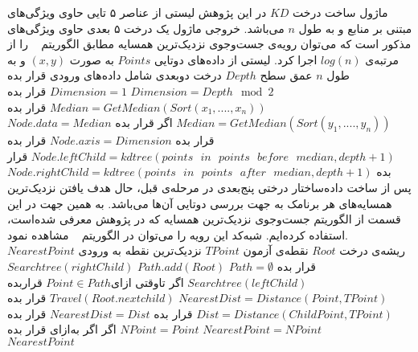 ماژول ساخت درخت $KD$ در این پژوهش لیستی از عناصر ۵ تایی حاوی ویژگی‌های مبتنی بر منابع و به طول $n$ می‌باشد. خروجی ماژول یک درخت ۵ بعدی حاوی ویژگی‌های مذکور است که می‌توان رویه‌ی جست‌و‌جوی نزدیک‌ترین همسایه‌ مطابق الگوریتم ~ را از مرتبه‌ی ${log(n)}$ اجرا کرد. 
 لیستی از داده‌های دوتایی $Points$ به صورت $(x,y)$ و به طول $n$ 
 عمق سطح $Depth$
 درخت دو‌بعدی شامل داده‌های ورودی
 قرار بده 
$Dimension=Depth \mod 2$
 $Dimension=1$
 قرار بده $Median=GetMedian(Sort(x_{1},....,x_{n}))$
 قرار‌ بده
$Median=GetMedian(Sort(y_{1},....,y_{n}))$
‌اگر
 قرار بده $Node.data=Median$
 قرار بده $Node.axis=Dimension$
 قرار بده
$Node.leftChild = kdtree(points \:\:\: in \:\:\: points \:\:\: before \:\:\: median, depth+1)$
 قرار بده
$Node.rightChild = kdtree(points \:\:\: in \:\:\: points \:\:\: after \:\:\: median, depth+1)$
پس از ساخت داده‌ساختار درختی پنج‌بعدی در مرحله‌ی قبل، حال هدف یافتن نزدیک‌ترین همسایه‌های هر برنامک به جهت بررسی دوتایی‌ آن‌ها می‌باشد. به همین جهت در این قسمت از الگوریتم جست‌و‌جوی نزدیک‌ترین همسایه که در پژوهش   معرفی شده‌است، استفاده کرده‌ایم. شبه‌کد این رویه را می‌توان در الگوریتم ~ مشاهده نمود.\\
 ریشه‌ی درخت $Root$ 
 نقطه‌ی آزمون $TPoint$
 نزدیک‌ترین نقطه به ورودی $NearestPoint$
 قرار‌ بده $Path=\emptyset$
 $Path.add(Root)$
 $Searchtree(rightChild)$
 $Searchtree(leftChild)$
‌اگر
‌تاوقتی
‌ازای{$Point \in Path$}
 قرار‌بده 
$NearestDist=Distance(Point,TPoint)$
 $Travel(Root.nextchild)$
 قرار بده 
$Dist=Distance(ChildPoint,TPoint)$
 قرار بده $NearestDist=Dist$
 قرار بده $NPoint=Point$
‌اگر
‌اگر
‌به‌ازای
 قرار بده $NearestPoint=NPoint$\\
  $NearestPoint$

